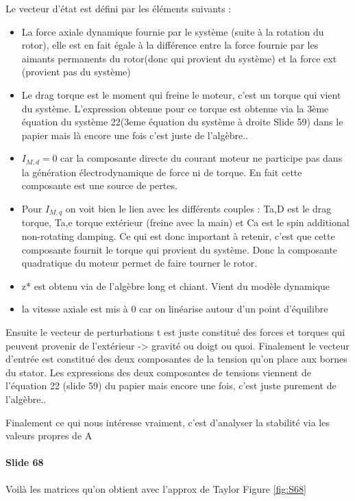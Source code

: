 Le vecteur d'état est défini par les éléments suivants :
\begin{itemize}
    \item La force axiale dynamique fournie par le système (suite à la rotation du rotor), elle est en fait égale à la différence entre la force fournie par les aimants permanents du rotor(donc qui provient du système) et la force ext (provient pas du système)
    \item Le drag torque est le moment qui freine le moteur, c'est un torque qui vient du système. L'expression obtenue pour ce torque est obtenue via la 3ème équation du système 22(3eme équation du système à droite Slide 59) dans le papier mais là encore une fois c'est juste de l'algèbre..
    \item $I_{M,d} = 0$ car la composante directe du courant moteur ne participe pas dans la génération électrodynamique de force ni de torque. En fait cette composante est une source de pertes.
    \item Pour $I_{M,q}$ on voit bien le lien avec les différents couples : Ta,D est le drag torque, Ta,e torque extérieur (freine avec la main) et Ca est le spin additional non-rotating damping. Ce qui est donc important à retenir, c'est que cette composante fournit le torque qui provient du système. Donc la composante quadratique du moteur permet de faire tourner le rotor.
    \item z* est obtenu via de l'algèbre long et chiant. Vient du modèle dynamique
    \item la vitesse axiale est mis à 0 car on linéarise autour d'un point d'équilibre
\end{itemize}

Ensuite le vecteur de perturbations t est juste constitué des forces et torques qui peuvent provenir de l'extérieur -> gravité ou doigt ou quoi.
Finalement le vecteur d'entrée est constitué des deux composantes de la tension qu'on place aux bornes du stator. Les expressions des deux composantes de tensions viennent de l'équation 22 (slide 59) du papier mais encore une fois, c'est juste purement de l'algèbre..

Finalement ce qui nous intéresse vraiment, c'est d'analyser la stabilité via les valeurs propres de A



\paragraph{Slide 68} Voilà les matrices qu'on obtient avec l'approx de Taylor Figure \ref{fig:S68}

